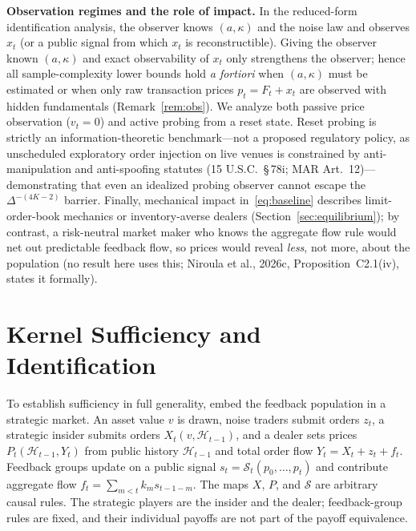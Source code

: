 \documentclass[11pt,letterpaper]{article}
\theoremstyle{definition}
\begin{document}
\textbf{Observation regimes and the role of impact.} In the reduced-form identification analysis, the observer knows $(a, \kappa)$ and the noise law and observes $x_t$ (or a public signal from which $x_t$ is reconstructible). Giving the observer known $(a, \kappa)$ and exact observability of $x_t$ only strengthens the observer; hence all sample-complexity lower bounds hold \emph{a fortiori} when $(a, \kappa)$ must be estimated or when only raw transaction prices $p_t = F_t + x_t$ are observed with hidden fundamentals (Remark~\ref{rem:obs}). We analyze both passive price observation ($v_t = 0$) and active probing from a reset state. Reset probing is strictly an information-theoretic benchmark---not a proposed regulatory policy, as unscheduled exploratory order injection on live venues is constrained by anti-manipulation and anti-spoofing statutes (15 U.S.C.\ \S\,78i; MAR Art.\ 12)---demonstrating that even an idealized probing observer cannot escape the $\Delta^{-(4K-2)}$ barrier. Finally, mechanical impact in~\eqref{eq:baseline} describes limit-order-book mechanics or inventory-averse dealers (Section~\ref{sec:equilibrium}); by contrast, a risk-neutral market maker who knows the aggregate flow rule would net out predictable feedback flow, so prices would reveal \emph{less}, not more, about the population (no result here uses this; Niroula et al., 2026c, Proposition~C2.1(iv), states it formally).

\section{Kernel Sufficiency and Identification}\label{sec:sufficiency}

To establish sufficiency in full generality, embed the feedback population in a strategic market. An asset value $v$ is drawn, noise traders submit orders $z_t$, a strategic insider submits orders $X_t(v, \mathcal{H}_{t-1})$, and a dealer sets prices $P_t(\mathcal{H}_{t-1}, Y_t)$ from public history $\mathcal{H}_{t-1}$ and total order flow $Y_t = X_t + z_t + f_t$. Feedback groups update on a public signal $s_t = \mathcal{S}_t(p_0, \dots, p_t)$ and contribute aggregate flow $f_t = \sum_{m < t} k_m s_{t-1-m}$. The maps $X$, $P$, and $\mathcal{S}$ are arbitrary causal rules. The strategic players are the insider and the dealer; feedback-group rules are fixed, and their individual payoffs are not part of the payoff equivalence.
\end{document}
